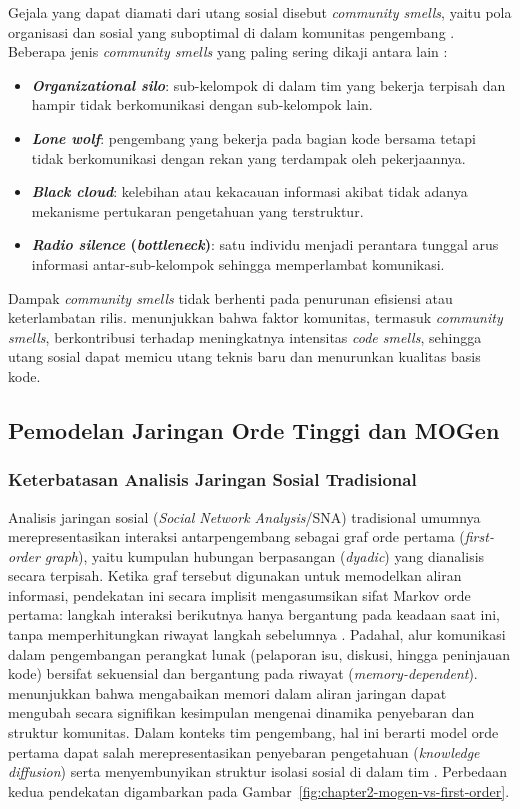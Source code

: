 Gejala yang dapat diamati dari utang sosial disebut \textit{community smells}, yaitu pola organisasi dan sosial yang suboptimal di dalam komunitas pengembang \parencite{tamburri2015}.
Beberapa jenis \textit{community smells} yang paling sering dikaji antara lain \parencite{tamburri2021exploring}:
\begin{itemize}
    \item \textbf{\textit{Organizational silo}}: sub-kelompok di dalam tim yang bekerja terpisah dan hampir tidak berkomunikasi dengan sub-kelompok lain.
    \item \textbf{\textit{Lone wolf}}: pengembang yang bekerja pada bagian kode bersama tetapi tidak berkomunikasi dengan rekan yang terdampak oleh pekerjaannya.
    \item \textbf{\textit{Black cloud}}: kelebihan atau kekacauan informasi akibat tidak adanya mekanisme pertukaran pengetahuan yang terstruktur.
    \item \textbf{\textit{Radio silence} (\textit{bottleneck})}: satu individu menjadi perantara tunggal arus informasi antar-sub-kelompok sehingga memperlambat komunikasi.
\end{itemize}
Dampak \textit{community smells} tidak berhenti pada penurunan efisiensi atau keterlambatan rilis.
\textcite{palomba2018beyond} menunjukkan bahwa faktor komunitas, termasuk \textit{community smells}, berkontribusi terhadap meningkatnya intensitas \textit{code smells}, sehingga utang sosial dapat memicu utang teknis baru dan menurunkan kualitas basis kode.

\subsection{Pemodelan Jaringan Orde Tinggi dan MOGen}

\subsubsection{Keterbatasan Analisis Jaringan Sosial Tradisional}
Analisis jaringan sosial (\textit{Social Network Analysis}/SNA) tradisional umumnya merepresentasikan interaksi antarpengembang sebagai graf orde pertama (\textit{first-order graph}), yaitu kumpulan hubungan berpasangan (\textit{dyadic}) yang dianalisis secara terpisah.
Ketika graf tersebut digunakan untuk memodelkan aliran informasi, pendekatan ini secara implisit mengasumsikan sifat Markov orde pertama: langkah interaksi berikutnya hanya bergantung pada keadaan saat ini, tanpa memperhitungkan riwayat langkah sebelumnya \parencite{scholtes2017network}.
Padahal, alur komunikasi dalam pengembangan perangkat lunak (pelaporan isu, diskusi, hingga peninjauan kode) bersifat sekuensial dan bergantung pada riwayat (\textit{memory-dependent}).
\textcite{rosvall2014memory} menunjukkan bahwa mengabaikan memori dalam aliran jaringan dapat mengubah secara signifikan kesimpulan mengenai dinamika penyebaran dan struktur komunitas.
Dalam konteks tim pengembang, hal ini berarti model orde pertama dapat salah merepresentasikan penyebaran pengetahuan (\textit{knowledge diffusion}) serta menyembunyikan struktur isolasi sosial di dalam tim \parencite{gote2023locating}.
Perbedaan kedua pendekatan digambarkan pada Gambar~\ref{fig:chapter2-mogen-vs-first-order}.

